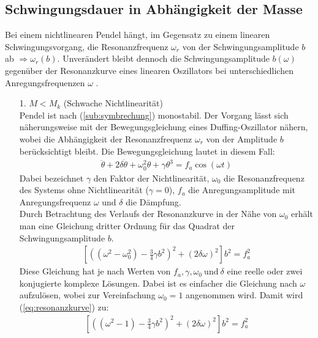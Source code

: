 \subsection{Schwingungsdauer in Abhängigkeit der Masse}
\label{sub:schwingungsdauer}
Bei einem nichtlinearen Pendel hängt, im Gegensatz zu einem linearen Schwingungsvorgang, die Resonanzfrequenz $\omega_r$ von der Schwingungsamplitude $b$ ab $\Rightarrow \omega_r(b)$. Unverändert bleibt dennoch die Schwingungsamplitude $b(\omega)$ gegenüber der Resonanzkurve eines linearen Oszillators bei unterschiedlichen Anregungsfrequenzen $\omega$ \citep{Lueck}.
\begin{itemize}
    \item[1.] $M<M_k$ (Schwache Nichtlinearität)\\
    Pendel ist nach (\ref{sub:symbrechung}) monostabil. Der Vorgang lässt sich näherungsweise mit der Bewegungsgleichung eines Duffing-Oszillator nähern, wobei die Abhängigkeit der Resonanzfrequenz $\omega_r$ von der Amplitude $b$ berücksichtigt bleibt. Die Bewegungsgleichung lautet in diesem Fall:
    \begin{gather}
        \ddot{\theta} + 2\delta\dot{\theta} + \omega_0^2\theta + \gamma\theta^3 = f_a\cos(\omega t)
    \end{gather}
    Dabei bezeichnet $\gamma$ den Faktor der Nichtlinearität, $\omega_0$ die Resonanzfrequenz des Systems ohne Nichtlinearität ($\gamma=0$), $f_a$ die Anregungsamplitude mit Anregungsfrequenz $\omega$ und $\delta$ die Dämpfung.\\
    Durch Betrachtung des Verlaufs der Resonanzkurve in der Nähe von $\omega_0$ erhält man eine Gleichung dritter Ordnung für das Quadrat der Schwingungsamplitude $b$.
    \begin{gather}
        \left[\left((\omega^2-\omega_0^2) - \frac{3}{4}\gamma b^2\right)^2+(2\delta\omega)^2\right]b^2=f_a^2 %
        \label{eq:resonanzkurve}
    \end{gather}
    Diese Gleichung hat je nach Werten von $f_a, \gamma, \omega_0~\text{und}~\delta$ eine reelle oder zwei konjugierte komplexe Lösungen.
    Dabei ist es einfacher die Gleichung nach $\omega$ aufzulösen, wobei zur Vereinfachung $\omega_0=1$ angenommen wird. Damit wird (\ref{eq:resonanzkurve}) zu:
    \begin{gather}
        \left[\left((\omega^2-1) - \frac{3}{4}\gamma b^2\right)^2+(2\delta\omega)^2\right]b^2=f_a^2
    \end{gather}

\end{itemize}
